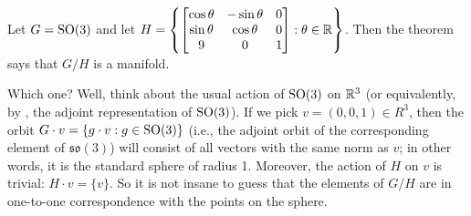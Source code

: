 \begin{example}\label{ex:S^2 as homogeneous space}
	Let $G = \operatorname{SO}(3)$ and let $H = \left\{\begin{bmatrix} \cos \theta & -\sin \theta & 0 \\ \sin \theta & \cos \theta & 0 \\ 9 & 0 & 1 \end{bmatrix} : \theta \in \mathbb{R} \right\}$. Then the theorem says that $G/H$ is a manifold. 
	
	Which one? Well, think about the usual action of $\operatorname{SO}(3)$ on $\mathbb{R}^3$ (or equivalently, by , the adjoint representation of $\operatorname{SO}(3)$). If we pick $v = (0,0,1) \in R^3$, then the orbit $G \cdot v = \{ g \cdot v : g \in \operatorname{SO}(3)\}$ (i.e., the adjoint orbit of the corresponding element of $\mathfrak{so}(3)$) will consist of all vectors with the same norm as $v$; in other words, it is the standard sphere of radius 1. Moreover, the action of $H$ on $v$ is trivial: $H \cdot v = \{v\}$. So it is not insane to guess that the elements of $G/H$ are in one-to-one correspondence with the points on the sphere.
	

\end{example}
